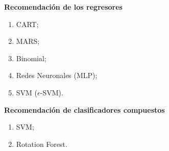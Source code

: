 \begin{frame}
	\begin{block}{}
		\textbf{Recomendación de los regresores}
		\begin{enumerate}
			\item CART;
			\item MARS;
			\item Binomial;
			\item Redes Neuronales (MLP);
			\item SVM (\(\epsilon\)-SVM).		
		\end{enumerate}
	\end{block}
\end{frame}

\begin{frame}
	\begin{block}{}
		\textbf{Recomendación de clasificadores compuestos}
		\begin{enumerate}
			\item SVM;
			\item Rotation Forest.		
		\end{enumerate}
	\end{block}
\end{frame}
